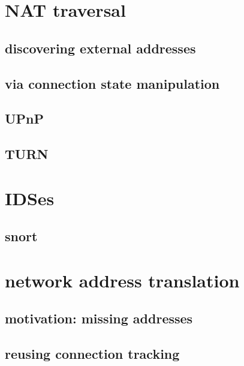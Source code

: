 \section{NAT traversal}

\subsection{discovering external addresses}

\subsection{via connection state manipulation}

\subsection{UPnP}

\subsection{TURN}

\section{IDSes}

\subsection{snort}

\section{network address translation}

\subsection{motivation: missing addresses}

\subsection{reusing connection tracking}
